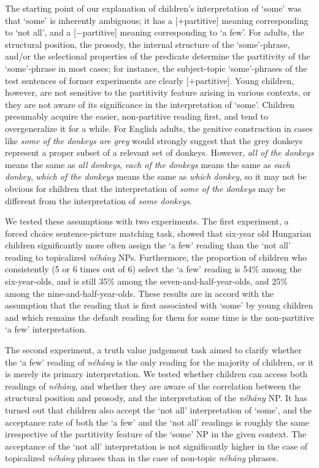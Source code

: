 \documentclass[output=paper]{langscibook}
\begin{document}
The starting point of our explanation of children’s interpretation of `some' was that `some' is inherently ambiguous; it has a [$+$partitive] meaning corresponding to `not all', and a [$-$partitive] meaning corresponding to `a few'. For adults, the structural position, the prosody, the internal structure of the `some'-phrase, and/or the selectional properties of the predicate determine the partitivity of the `some'-phrase in most cases; for instance, the subject-topic `some'-phrases of the test sentences of former experiments are clearly [$+$partitive]. Young children, however, are not sensitive to the partitivity feature arising in various contexts, or they are not aware of its significance in the interpretation of `some'. Children presumably acquire the easier, non-partitive reading first, and tend to overgeneralize it for a while. For English adults, the genitive construction in cases like \textit{some of the donkeys are grey} would strongly suggest that the grey donkeys represent a proper subset of a relevant set of donkeys. However, \textit{all of the donkeys} means the same as \textit{all donkeys}, \textit{each of the donkeys} means the same as \textit{each donkey}, \textit{which of the donkeys} means the same as \textit{which donkey}, so it may not be obvious for children that the interpretation of \textit{some of the donkeys} may be different from the interpretation of \textit{some donkeys}.

We tested these assumptions with two experiments. The first experiment, a forced choice sentence-picture matching task, showed that six-year old Hungarian children significantly more often assign the `a few' reading than the `not all' reading to topicalized \textit{néhány} NPs. Furthermore, the proportion of children who consistently (5 or 6 times out of 6) select the `a few' reading is 54\% among the six-year-olds, and is still 35\% among the seven-and-half-year-olds, and 25\% among the nine-and-half-year-olds. These results are in accord with the assumption that the reading that is first associated with `some' by young children and which remains the default reading for them for some time is the non-partitive `a few' interpretation. 

The second experiment, a truth value judgement task aimed to clarify whether the `a few' reading of \textit{néhány} is the only reading for the majority of children, or it is merely its primary interpretation. We tested whether children can access both readings of \textit{néhány}, and whether they are aware of the correlation between the structural position and prosody, and the interpretation of the \textit{néhány} NP. It has turned out that children also accept the `not all' interpretation of `some', and the acceptance rate of both the `a few' and the `not all' readings is roughly the same irrespective of the partitivity feature of the `some' NP in the given context. The acceptance of the `not all' interpretation is not significantly higher in the case of topicalized \textit{néhány} phrases than in the case of non-topic \textit{néhány} phrases.
\end{document}
